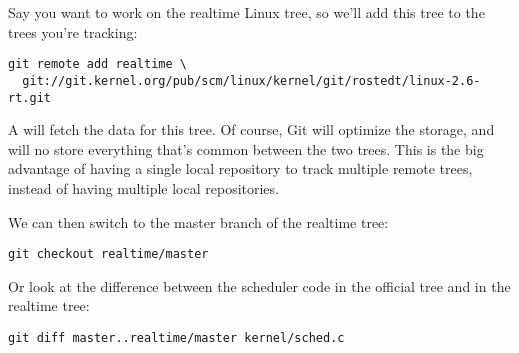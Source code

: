 Say you want to work on the realtime Linux tree, so we'll add this
tree to the trees you're tracking:

\small
\begin{verbatim}
git remote add realtime \
  git://git.kernel.org/pub/scm/linux/kernel/git/rostedt/linux-2.6-rt.git
\end{verbatim}
\normalsize

A  will fetch the data for this tree. Of course, Git
will optimize the storage, and will no store everything that's common
between the two trees. This is the big advantage of having a single
local repository to track multiple remote trees, instead of having
multiple local repositories.

We can then switch to the master branch of the realtime tree:

\begin{verbatim}
git checkout realtime/master
\end{verbatim}

Or look at the difference between the scheduler code in the official
tree and in the realtime tree:

\begin{verbatim}
git diff master..realtime/master kernel/sched.c
\end{verbatim}

